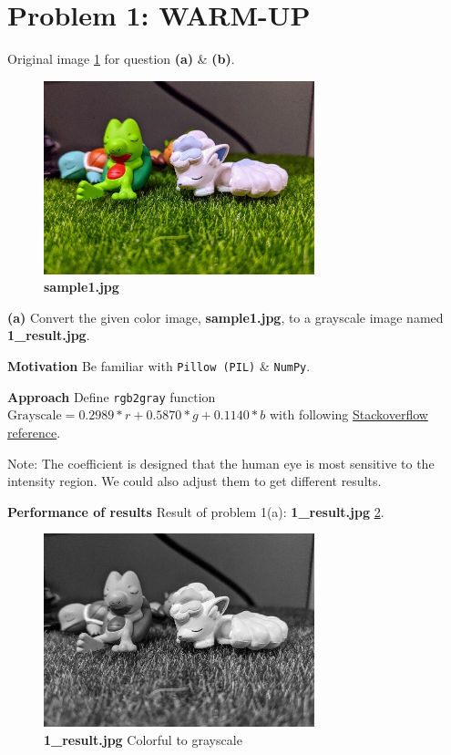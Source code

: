 \section{Problem 1: WARM-UP}\label{problem-1-warm-up}
Original image \cref{fig1} for question \textbf{(a)} \& \textbf{(b)}.
\begin{figure}
    \centering
    \includegraphics[width=0.7\textwidth]{image/sample1.jpg}
    \caption{\textbf{sample1.jpg}}
    \label{fig1}
\end{figure}

\textbf{(a)} Convert the given color image, \textbf{sample1.jpg}, to a grayscale image named \textbf{1\_result.jpg}.

\textbf{Motivation}
Be familiar with \texttt{Pillow (PIL)} \& \texttt{NumPy}.

\textbf{Approach}
Define \texttt{rgb2gray} function \(\mbox{Grayscale} = 0.2989 * r + 0.5870 * g + 0.1140 * b\) with following \href{https://stackoverflow.com/questions/12201577/how-can-i-convert-an-rgb-image-into-grayscale-in-python}{Stackoverflow reference}.

Note: The coefficient is designed that the human eye is most sensitive to the intensity region. We could also adjust them to get different results.

\textbf{Performance of results}
Result of problem 1(a): \textbf{1\_result.jpg} \cref{fig1a}.
\begin{figure}
    \centering
    \includegraphics[width=0.7\textwidth]{image/1_result.jpg}
    \caption{\textbf{1\_result.jpg} Colorful to grayscale}
    \label{fig1a}
\end{figure}

